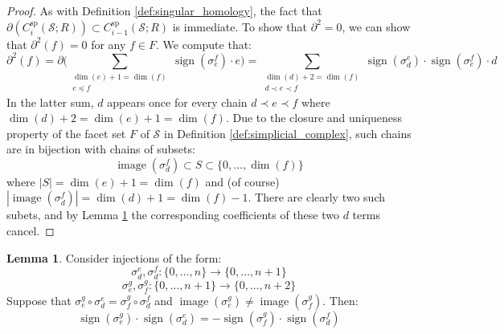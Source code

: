 \documentclass[12pt]{article}
\theoremstyle{definition}
\numberwithin{equation}{section}
\newtheorem{lemma}[theorem]{Lemma}
\newcommand{\op}{\operatorname}
\begin{document}
\begin{proof} As with Definition \ref{def:singular_homology}, the fact that $\partial(C^{\op{sp}}_i(\mathcal{S};R)) \subset C^{\op{sp}}_{i-1}(\mathcal{S};R)$ is immediate. To show that $\partial^2 = 0$, we can show that $\partial^2(f) = 0$ for any $f \in F$. We compute that:
\[
\partial^2(f) = \partial\big(\sum_{\substack{\op{dim}(e) + 1 = \op{dim}(f)\\ e \preccurlyeq f}} \op{sign}(\sigma^f_e) \cdot e\big)
= \sum_{\substack{\op{dim}(d) + 2 = \op{dim}(f)\\ d \prec e \prec f}} \op{sign}(\sigma^e_d) \cdot \op{sign}(\sigma^f_e) \cdot d 
\]
In the latter sum, $d$ appears once for every chain $d \prec e \prec f$ where $\op{dim}(d) + 2 = \op{dim}(e) + 1 = \op{dim}(f)$. Due to the closure and uniqueness property of the facet set $F$ of $\mathcal{S}$ in Definition \ref{def:simplicial_complex}, such chains are in bijection with chains of subsets:
\[
\op{image}(\sigma^f_d) \subset S \subset \{0,\dots,\op{dim}(f)\}
\]
where $|S| = \op{dim}(e) + 1 = \op{dim}(f)$ and (of course) $|\op{image}(\sigma^f_d)| = \op{dim}(d) + 1 = \op{dim}(f) - 1$. There are clearly two such subets, and by Lemma \ref{lem:simplex_inclusion_a} the corresponding coefficients of these two $d$ terms cancel.
\end{proof}

\begin{lemma} \label{lem:simplex_inclusion_a} Consider injections of the form:
\[\sigma_d^e,\sigma_d^f:\{0,\dots,n\} \to \{0,\dots,n+1\}\]
\[\sigma_e^g,\sigma_f^g:\{0,\dots,n+1\} \to \{0,\dots,n+2\}\] 
Suppose that $\sigma^g_e\circ \sigma^e_d = \sigma^g_f \circ \sigma^f_d$ and $\op{image}(\sigma^g_e) \neq \op{image}(\sigma^g_f)$. Then:
\[
\op{sign}(\sigma^g_e) \cdot \op{sign}(\sigma^e_d) = - \op{sign}(\sigma^g_f) \cdot \op{sign}(\sigma^f_d)
\]
\end{lemma}
\end{document}
